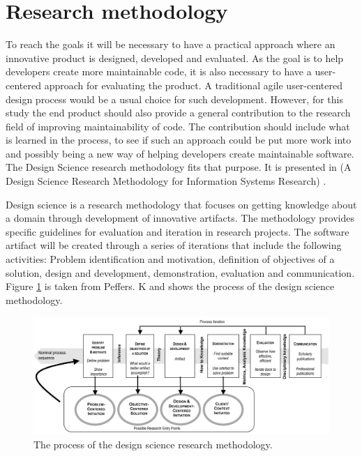 \documentclass[pdftex,10pt,b5paper,twoside]{report}
\begin{document}
\section{Research methodology}
To reach the goals it will be necessary to have a practical approach where an innovative product is designed, developed and evaluated. As the goal is to help developers create more maintainable code, it is also necessary to have a user-centered approach for evaluating the product. A traditional agile user-centered design process would be a usual choice for such development. However, for this study the end product should also provide a general contribution to the research field of improving maintainability of code. The contribution should include what is learned in the process, to see if such an approach could be put more work into and possibly being a new way of helping developers create maintainable software. The Design Science research methodology fits that purpose. It is presented in (A Design Science Research Methodology for Information Systems Research) \cite{Peffers2007ADS}.

Design science is a research methodology that focuses on getting knowledge about a domain through development of innovative artifacts. The methodology provides specific guidelines for evaluation and iteration in research projects. The software artifact will be created through a series of iterations that include the following activities: Problem identification and motivation, definition of objectives of a solution, design and development, demonstration, evaluation and communication. Figure \ref{fig:designScience} is taken from Peffers. K \cite{Peffers2007ADS} and shows the process of the design science methodology. 

\begin{figure}[h!]
    \centering
    \includegraphics[width=\textwidth]{report/images/designScience.png}
    \caption{The process of the design science research methodology.}
    \label{fig:designScience}
\end{figure}
\end{document}

